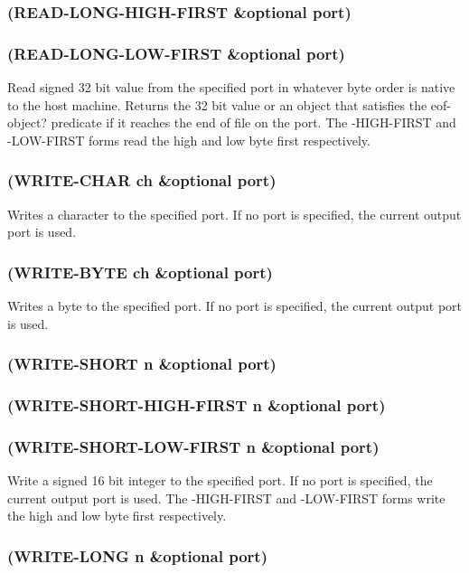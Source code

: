 \documentclass[11pt]{article}
\begin{document}
\subsubsection{(READ-LONG-HIGH-FIRST \&optional port)}
\label{sec-4-34-12}
\subsubsection{(READ-LONG-LOW-FIRST \&optional port)}
\label{sec-4-34-13}

Read signed 32 bit value from the specified port in whatever byte
order is native to the host machine.  Returns the 32 bit value or an
object that satisfies the eof-object? predicate if it reaches the end
of file on the port.  The -HIGH-FIRST and -LOW-FIRST forms read the
high and low byte first respectively.
\subsubsection{(WRITE-CHAR ch \&optional port)}
\label{sec-4-34-14}

Writes a character to the specified port.  If no port is specified,
the current output port is used.
\subsubsection{(WRITE-BYTE ch \&optional port)}
\label{sec-4-34-15}

Writes a byte to the specified port.  If no port is specified, the
current output port is used.
\subsubsection{(WRITE-SHORT n \&optional port)}
\label{sec-4-34-16}
\subsubsection{(WRITE-SHORT-HIGH-FIRST n \&optional port)}
\label{sec-4-34-17}
\subsubsection{(WRITE-SHORT-LOW-FIRST n \&optional port)}
\label{sec-4-34-18}

Write a signed 16 bit integer to the specified port.  If no port is
specified, the current output port is used.  The -HIGH-FIRST and
-LOW-FIRST forms write the high and low byte first respectively.
\subsubsection{(WRITE-LONG n \&optional port)}
\label{sec-4-34-19}
\end{document}
